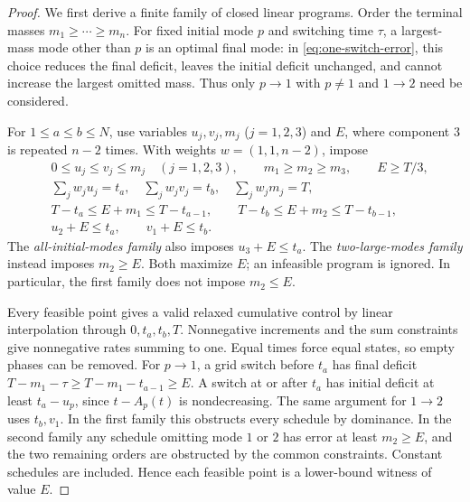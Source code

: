 \begin{proof}
We first derive a finite family of closed linear programs. Order the terminal
masses $m_1\ge\cdots\ge m_n$. For fixed initial mode $p$ and switching
time $\tau$, a largest-mass mode other than $p$ is an optimal final mode:
in \eqref{eq:one-switch-error}, this choice reduces the final deficit,
leaves the initial deficit unchanged, and cannot increase the largest
omitted mass. Thus only $p\to1$ with $p\ne1$ and $1\to2$ need be
considered.

For $1\le a\le b\le N$, use variables $u_j,v_j,m_j$ ($j=1,2,3$) and
$E$, where component $3$ is repeated $n-2$ times. With weights
$w=(1,1,n-2)$, impose
\begin{subequations}\label{eq:grid-LP}
\begin{align}
 &0\le u_j\le v_j\le m_j\quad(j=1,2,3),\qquad
 m_1\ge m_2\ge m_3,\qquad E\ge T/3,\\
 &\sum_jw_ju_j=t_a,\quad\sum_jw_jv_j=t_b,
       \quad\sum_jw_jm_j=T,\\
 &T-t_a\le E+m_1\le T-t_{a-1},\qquad
 T-t_b\le E+m_2\le T-t_{b-1},\\
 &u_2+E\le t_a,\qquad v_1+E\le t_b.
\end{align}
\end{subequations}
The \emph{all-initial-modes family} also imposes $u_3+E\le t_a$.
The \emph{two-large-modes family} instead imposes $m_2\ge E$.
Both maximize $E$; an infeasible program is ignored. In particular, the
first family does not impose $m_2\le E$.

Every feasible point gives a valid relaxed cumulative control by linear
interpolation through $0,t_a,t_b,T$. Nonnegative increments and the sum
constraints give nonnegative rates summing to one. Equal times force equal
states, so empty phases can be removed. For $p\to1$, a grid switch before
$t_a$ has final deficit
$T-m_1-\tau\ge T-m_1-t_{a-1}\ge E$.
A switch at or after $t_a$ has initial deficit at least $t_a-u_p$, since
$t-A_p(t)$ is nondecreasing. The same argument for $1\to2$ uses $t_b,v_1$.
In the first family this obstructs every schedule by dominance. In the
second family any schedule omitting mode $1$ or $2$ has error at least
$m_2\ge E$, and the two remaining orders are obstructed by the common
constraints. Constant schedules are included. Hence each feasible point
is a lower-bound witness of value $E$.


\end{proof}
